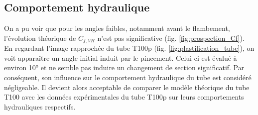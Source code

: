 	\subsection{Comportement hydraulique}
	\label{subsec:5.3.2_Comportement hydraulique}
On a pu voir que pour les angles faibles, notamment avant le flambement, l'évolution théorique de $C_{f,VH}$ n'est pas significative (fig. \ref{fig:prospection_Cf}). En regardant l'image rapprochée du tube T100p (fig. \ref{fig:plastification_tube}), on voit apparaître un angle initial induit par le pincement. Celui-ci est évalué à environ \ang{10} et ne semble pas induire un changement de section significatif. Par conséquent, son influence sur le comportement hydraulique du tube est considéré négligeable. Il devient alors acceptable de comparer le modèle théorique du tube T100 avec les données expérimentales du tube T100p sur leurs comportements hydrauliques respectifs.
